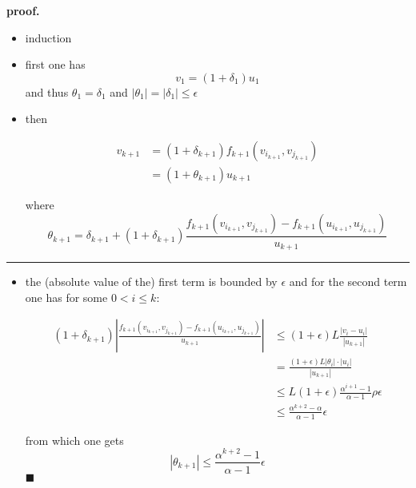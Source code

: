 \documentclass[11pt]{article}
\providecommand{\tightlist}{%
      \setlength{\itemsep}{0pt}\setlength{\parskip}{0pt}}
\begin{document}
\textbf{proof.}

\begin{itemize}
\item
  induction
\item
  first one has \[v_1 = (1+\delta_1) u_1\] and thus
  \(\theta_1 = \delta_1\) and \(|\theta_1| = |\delta_1| \leq \epsilon\)
\item
  then

  \begin{align*} v_{k+1} &= (1+\delta_{k+1}) f_{k+1}(v_{i_{k+1}}, v_{j_{k+1}})\\
   &= (1+\theta_{k+1}) u_{k+1}
    \end{align*}

  where \[
    \theta_{k+1} = \delta_{k+1} + (1+\delta_{k+1})\frac{f_{k+1}(v_{i_{k+1}},v_{j_{k+1}})-f_{k+1}(u_{i_{k+1}},u_{j_{k+1}})}{u_{k+1}}
    \]
\end{itemize}

\begin{center}\rule{0.5\linewidth}{\linethickness}\end{center}

\begin{itemize}
\tightlist
\item
  the (absolute value of the) first term is bounded by \(\epsilon\) and
  for the second term one has for some \(0< i \leq k\):

  \begin{align*}
     (1+\delta_{k+1})\left|\frac{f_{k+1}(v_{i_{k+1}},v_{j_{k+1}})-f_{k+1}(u_{i_{k+1}},u_{j_{k+1}})}{u_{k+1}}\right|
     & \leq (1+\epsilon)L \frac{\left| v_i - u_i\right|}{\left|u_{k+1}\right|} \\
     & = \frac{(1+\epsilon)L|\theta_i|\cdot|u_i|}{|u_{k+1}|} \\ & \leq L(1+\epsilon)\frac{\alpha^{i+1}-1}{\alpha-1}\rho\epsilon \\ 
     &\leq \frac{\alpha^{k+2}-\alpha}{\alpha-1} \epsilon
    \end{align*}

  from which one gets
  \[|\theta_{k+1}| \leq \frac{\alpha^{k+2}-1}{\alpha-1}\epsilon\]
  \(\blacksquare\)
\end{itemize}


    
    
    
    
\end{document}
